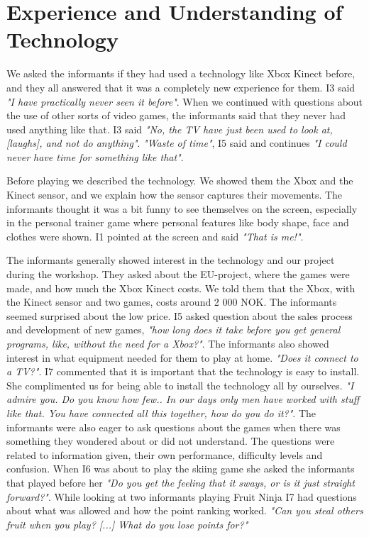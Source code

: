 \section{Experience and Understanding of Technology}
We asked the informants if they had used a technology like Xbox Kinect before, and they all answered that it was a completely new experience for them. I3 said \emph{"I have practically never seen it before"}. When we continued with questions about the use of other sorts of video games, the informants said that they never had used anything like that. I3 said \emph{"No, the TV have just been used to look at, [laughs], and not do anything"}. \emph{"Waste of time"}, I5 said and continues \emph{"I could never have time for something like that"}.  

Before playing we described the technology. We showed them the Xbox and the Kinect sensor, and we explain how the sensor captures their movements. The informants thought it was a bit funny to see themselves on the screen, especially in the personal trainer game where personal features like body shape, face and clothes were shown. I1 pointed at the screen and said \emph{"That is me!"}. 

The informants generally showed interest in the technology and our project during the workshop. They asked about the EU-project, where the games were made, and how much the Xbox Kinect costs. We told them that the Xbox, with the Kinect sensor and two games, costs around 2 000 NOK. The informants seemed surprised about the low price. I5 asked question about the sales process and development of new games, \emph{"how long does it take before you get general programs, like, without the need for a Xbox?"}. The informants also showed interest in what equipment needed for them to play at home. \emph{"Does it connect to a TV?"}. I7 commented that it is important that the technology is easy to install. She complimented us for being able to install the technology all by ourselves. \emph{"I admire you. Do you know how few.. In our days only men have worked with stuff like that. You have connected all this together, how do you do it?"}.  The informants were also eager to ask questions about the games when there was something they wondered about or did not understand. The questions were related to information given, their own performance, difficulty levels and confusion. When I6 was about to play the skiing game she asked the informants that played before her \emph{"Do you get the feeling that it sways, or is it just straight forward?"}. While looking at two informants playing Fruit Ninja I7 had questions about what was allowed and how the point ranking worked. \emph{"Can you steal others fruit when you play? [...] What do you lose points for?"} 

